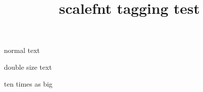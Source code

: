 \documentclass{article}
\title{scalefnt tagging test}
\begin{document}
normal text

{ double size text}

{ ten times as big}
\end{document}

